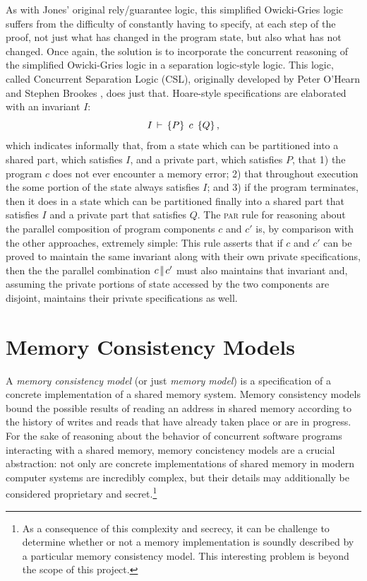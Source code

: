 \documentclass[11pt]{report}         %
\begin{document}
As with Jones' original rely/guarantee logic, this simplified Owicki-Gries logic suffers from the difficulty of constantly having to specify, at each step of the proof, not just what has changed in the program state, but also what has not changed. Once again, the solution is to incorporate the concurrent reasoning of the simplified Owicki-Gries logic in a separation logic-style logic. This logic, called Concurrent Separation Logic (CSL), originally developed by Peter O'Hearn and Stephen Brookes \cite{DBLP:journals/tcs/OHearn07,DBLP:journals/tcs/Brookes07}, does just that. Hoare-style specifications are elaborated with an invariant $I$: \[ I\,\vdash\,\left\lbrace P \right\rbrace\;c\;\left\lbrace Q \right\rbrace,\] which indicates informally that, from a state which can be partitioned into a shared part, which satisfies $I$, and a private part, which satisfies $P$, that 1) the program $c$ does not ever encounter a memory error; 2) that throughout execution the some portion of the state always satisfies $I$; and 3) if the program terminates, then it does in a state which can be partitioned finally into a shared part that satisfies $I$ and a private part that satisfies $Q$. The \textsc{par} rule for reasoning about the parallel composition of program components $c$ and $c'$ is, by comparison with the other approaches, extremely simple:  This rule asserts that if $c$ and $c'$ can be proved to maintain the same invariant along with their own private specifications, then the the parallel combination $c \operatorname{|\!|} c'$ must also maintains that invariant and, assuming the private portions of state accessed by the two components are disjoint, maintains their private specifications as well. 

\section{Memory Consistency Models}
\label{sec:memory-models}

A \emph{memory consistency model} (or just \emph{memory model}) is a specification of a concrete implementation of a shared memory system. Memory consistency models bound the possible results of reading an address in shared memory according to the history of writes and reads that have already taken place or are in progress. For the sake of reasoning about the behavior of concurrent software programs interacting with a shared memory, memory concistency models are a crucial abstraction: not only are concrete implementations of shared memory in modern computer systems are incredibly complex, but their details may additionally be considered proprietary and secret.\footnote{As a consequence of this complexity and secrecy, it can be challenge to determine whether or not a memory implementation is soundly described by a particular memory consistency model. This interesting problem is beyond the scope of this project.}  
\end{document}
